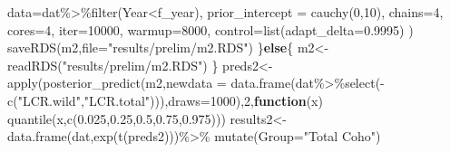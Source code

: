 \documentclass[
]{article}
\newenvironment{Shaded}{\begin{snugshade}}{\end{snugshade}}
\newcommand{\AttributeTok}[1]{\textcolor[rgb]{0.77,0.63,0.00}{#1}}
\newcommand{\ControlFlowTok}[1]{\textcolor[rgb]{0.13,0.29,0.53}{\textbf{#1}}}
\newcommand{\DecValTok}[1]{\textcolor[rgb]{0.00,0.00,0.81}{#1}}
\newcommand{\FloatTok}[1]{\textcolor[rgb]{0.00,0.00,0.81}{#1}}
\newcommand{\FunctionTok}[1]{\textcolor[rgb]{0.00,0.00,0.00}{#1}}
\newcommand{\NormalTok}[1]{#1}
\newcommand{\OtherTok}[1]{\textcolor[rgb]{0.56,0.35,0.01}{#1}}
\newcommand{\SpecialCharTok}[1]{\textcolor[rgb]{0.00,0.00,0.00}{#1}}
\newcommand{\StringTok}[1]{\textcolor[rgb]{0.31,0.60,0.02}{#1}}
\begin{document}
\begin{Shaded}
\begin{Highlighting}[]
                 \AttributeTok{data=}\NormalTok{dat}\SpecialCharTok{\%\textgreater{}\%}\FunctionTok{filter}\NormalTok{(Year}\SpecialCharTok{\textless{}}\NormalTok{f\_year),}
                 \AttributeTok{prior\_intercept =} \FunctionTok{cauchy}\NormalTok{(}\DecValTok{0}\NormalTok{,}\DecValTok{10}\NormalTok{),}
                 \AttributeTok{chains=}\DecValTok{4}\NormalTok{,}
                 \AttributeTok{cores=}\DecValTok{4}\NormalTok{,}
                 \AttributeTok{iter=}\DecValTok{10000}\NormalTok{,}
                 \AttributeTok{warmup=}\DecValTok{8000}\NormalTok{,}
                 \AttributeTok{control=}\FunctionTok{list}\NormalTok{(}\AttributeTok{adapt\_delta=}\FloatTok{0.9995}\NormalTok{)}
\NormalTok{  )}
  \FunctionTok{saveRDS}\NormalTok{(m2,}\AttributeTok{file=}\StringTok{"results/prelim/m2.RDS"}\NormalTok{)}
\NormalTok{\}}\ControlFlowTok{else}\NormalTok{\{}
\NormalTok{    m2}\OtherTok{\textless{}{-}}\FunctionTok{readRDS}\NormalTok{(}\StringTok{"results/prelim/m2.RDS"}\NormalTok{)}
\NormalTok{  \}}
\NormalTok{preds2}\OtherTok{\textless{}{-}}\FunctionTok{apply}\NormalTok{(}\FunctionTok{posterior\_predict}\NormalTok{(m2,}\AttributeTok{newdata =} \FunctionTok{data.frame}\NormalTok{(dat}\SpecialCharTok{\%\textgreater{}\%}\FunctionTok{select}\NormalTok{(}\SpecialCharTok{{-}}\FunctionTok{c}\NormalTok{(}\StringTok{"LCR.wild"}\NormalTok{,}\StringTok{"LCR.total"}\NormalTok{))),}\AttributeTok{draws=}\DecValTok{1000}\NormalTok{),}\DecValTok{2}\NormalTok{,}\ControlFlowTok{function}\NormalTok{(x) }\FunctionTok{quantile}\NormalTok{(x,}\FunctionTok{c}\NormalTok{(}\FloatTok{0.025}\NormalTok{,}\FloatTok{0.25}\NormalTok{,}\FloatTok{0.5}\NormalTok{,}\FloatTok{0.75}\NormalTok{,}\FloatTok{0.975}\NormalTok{)))}
\NormalTok{results2}\OtherTok{\textless{}{-}}\FunctionTok{data.frame}\NormalTok{(dat,}\FunctionTok{exp}\NormalTok{(}\FunctionTok{t}\NormalTok{(preds2)))}\SpecialCharTok{\%\textgreater{}\%}
  \FunctionTok{mutate}\NormalTok{(}\AttributeTok{Group=}\StringTok{"Total Coho"}\NormalTok{)}


\end{Highlighting}
\end{Shaded}
\end{document}
